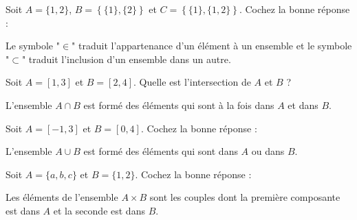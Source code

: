 \begin{question}
Soit $A=\{1,2\}$, $B=\left\{\{1\},\{2\}\right\}$ et $C=\left\{\{1\},\{1,2\}\right\}$. Cochez la bonne réponse :
\begin{answers}  
\end{answers}
\begin{explanations}
Le symbole "$\in$" traduit l'appartenance d'un élément à un ensemble et le symbole "$\subset$" traduit l'inclusion d'un ensemble dans un autre.
\end{explanations}
\end{question}


\begin{question}
Soit $A=[1,3]$ et $B=[2,4]$. Quelle est l'intersection de $A$ et $B$ ?
\begin{answers}  
\end{answers}
\begin{explanations}
L'ensemble $A\cap B$ est formé des éléments qui sont à la fois dans $A$ et dans $B$.
\end{explanations}
\end{question}


\begin{question}
Soit $A=[-1,3]$ et $B=[0,4]$. Cochez la bonne réponse :
\begin{answers}  
\end{answers}
\begin{explanations}
L'ensemble $A\cup B$ est formé des éléments qui sont dans $A$ ou dans $B$.
\end{explanations}
\end{question}


\begin{question}
Soit $A=\{a,b,c\}$ et $B=\{1,2\}$. Cochez la bonne réponse :
\begin{answers}  
\end{answers}
\begin{explanations}
Les éléments de l'ensemble $A\times B$ sont les couples dont la première composante est dans $A$ et la seconde est dans $B$.
\end{explanations}
\end{question}


